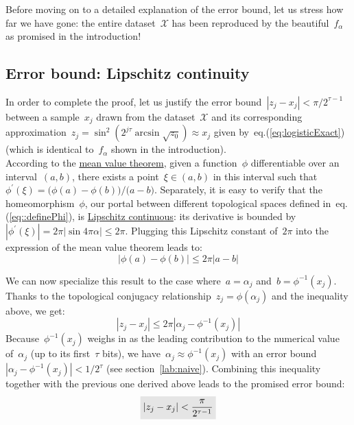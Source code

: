 \documentclass{article}
\newcommand{\highlight}[2][yellow]{\mathchoice%
  {\colorbox{#1}{$\displaystyle#2$}}%
  {\colorbox{#1}{$\textstyle#2$}}%
  {\colorbox{#1}{$\scriptstyle#2$}}%
  {\colorbox{#1}{$\scriptscriptstyle#2$}}}%
\begin{document}
\noindent Before moving on to a detailed explanation of the error bound, let us stress how far we have gone: the entire dataset~$\mathcal{X}$ has been reproduced by the beautiful~$f_\alpha$ as promised in the introduction!

\subsection{Error bound: Lipschitz continuity}
\label{ref::lipschitz}

In order to complete the proof, let us justify the error bound~$\left| z_j - x_j \right| < \pi / 2^{\tau-1}$ between a sample~$x_j$ drawn from the dataset~$\mathcal{X}$ and its corresponding approximation~$z_j = \sin^2 \left( 2^{j\tau} \arcsin{\sqrt{z_0}} \right) \approx x_j$ given by~eq.(\ref{eq:logisticExact}) (which is identical to~$f_\alpha$ shown in the introduction). \\

\noindent According to the \href{https://en.wikipedia.org/wiki/Mean\_value\_theorem}{mean value theorem}, given a function~$\phi$ differentiable over an interval~$(a, b)$, there exists a point~$\xi \in (a,b)$ in this interval such that~$\phi^\prime(\xi) = \big( \phi(a) - \phi(b) \big) / \big(a-b \big)$.  Separately, it is easy to verify that the homeomorphism~$\phi$, our portal between different topological spaces defined in~eq.(\ref{eq::definePhi}), is \href{https://en.wikipedia.org/wiki/Lipschitz\_continuity}{Lipschitz continuous}: its derivative is bounded by~$\left| \phi^\prime(\xi) \right| = 2 \pi \left| \sin 4\pi \alpha \right| \leq 2 \pi$.  Plugging this Lipschitz constant of~$2\pi$ into the expression of the mean value theorem leads to:
\begin{equation*}
\left| \phi(a) - \phi(b) \right| \leq  2\pi \left| a - b \right|
\end{equation*}

\noindent We can now specialize this result to the case where~$a = \alpha_j$ and~$b = \phi^{-1}(x_j)$.  Thanks to the topological conjugacy relationship~$z_j = \phi(\alpha_j)$ and the inequality above, we get:
\begin{equation*}
\left| z_j - x_j  \right|  \leq 2\pi \left| \alpha_j - \phi^{-1}(x_j) \right|
\end{equation*}
Because~$\phi^{-1}(x_j)$ weighs in as the leading contribution to the numerical value of~$\alpha_j$ (up to its first~$\tau$ bits), we have~$\alpha_j \approx \phi^{-1}(x_j)$ with an error bound~$\left| \alpha_j - \phi^{-1}(x_j) \right| < 1/2^\tau$ (see section~\ref{lab:naive}).  Combining this inequality together with the previous one derived above leads to the promised error bound:
\begin{equation*}
\highlight[black!10]{\left| z_j - x_j  \right| < \dfrac{\pi}{2^{\tau-1}} }
\end{equation*}
\end{document}

